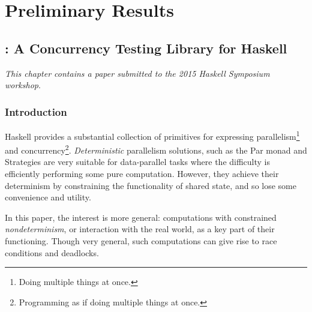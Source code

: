 \part{Preliminary Results}
\label{sec:prelims}


\chapter{\dejafu{}: A Concurrency Testing Library for Haskell}
\label{chp:dejafu}

\textit{This chapter contains a paper submitted to the 2015 Haskell
  Symposium workshop}\cite{dejafu}.

\section{Introduction}
\label{sec:dejafu-intro}

Haskell provides a substantial collection of primitives for expressing
parallelism\footnote{Doing multiple things at once.} and
concurrency\footnote{Programming as if doing multiple things at
  once.}. \textit{Deterministic} parallelism solutions, such as the
Par monad\cite{parmonad} and Strategies\cite{strategies} are very
suitable for data-parallel tasks where the difficulty is efficiently
performing some pure computation. However, they achieve their
determinism by constraining the functionality of shared state, and so
lose some convenience and utility.

In this paper, the interest is more general: computations with
constrained \textit{nondeterminism}, or interaction with the real
world, as a key part of their functioning. Though very general, such
computations can give rise to race conditions and deadlocks.

